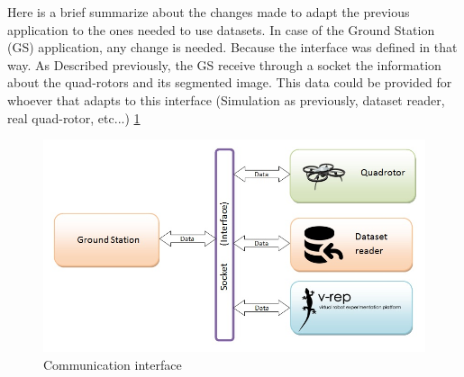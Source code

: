 
	Here is a brief summarize about the changes made to adapt the previous application to the ones needed to use datasets. In case of the Ground Station (GS) application, any change is needed. Because the interface was defined in that way. As Described previously, the GS receive through a socket the information about the quad-rotors and its segmented image. This data could be provided for whoever that adapts to this interface (Simulation as previously, dataset reader, real quad-rotor, etc...) \ref{fig:Interfaces}
	
	\begin{figure}[th]
		\centering
		\includegraphics[width=\linewidth]{../Images/c4/Interfaces}
		\caption{Communication interface}
		\label{fig:Interfaces}
	\end{figure}

	